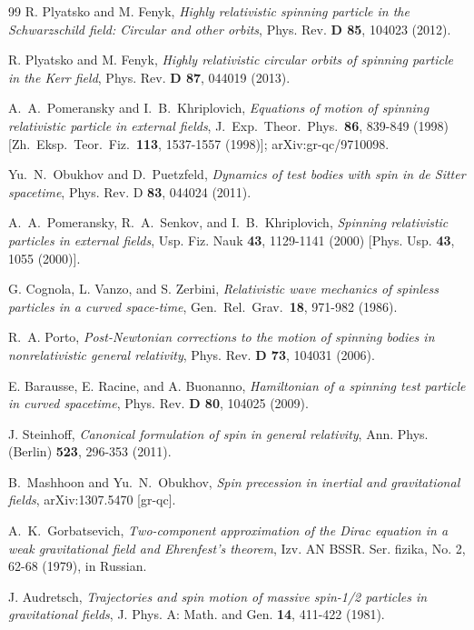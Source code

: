 \documentclass[preprint,showpacs,preprintnumbers,eqsecnum,amsmath,amssymb]{revtex4-1}
\begin{document}
\begin{thebibliography}{99}
R. Plyatsko and M. Fenyk, {\it Highly relativistic spinning particle in the
Schwarzschild field: Circular and other orbits},
Phys. Rev. {\bf D 85}, 104023 (2012).

R. Plyatsko and M. Fenyk,
{\it Highly relativistic circular orbits of spinning particle in the Kerr field},
Phys. Rev. {\bf D 87}, 044019 (2013).

A.~A.~Pomeransky and I.~B.~Khriplovich,
{\it Equations of motion of spinning relativistic particle in external fields},
  J.\ Exp.\ Theor.\ Phys.\ {\bf 86}, 839-849 (1998)
  [Zh.\ Eksp.\ Teor.\ Fiz.\ {\bf 113}, 1537-1557 (1998)];
  arXiv:gr-qc/9710098.

Yu.~N.~Obukhov and D.~Puetzfeld,
{\it Dynamics of test bodies with spin in de Sitter spacetime},
Phys. Rev. D {\bf 83}, 044024 (2011). %

A.~A.~Pomeransky, R.~A.~Senkov, and I.~B.~Khrip\-lo\-vich,
{\it Spinning relativistic particles in external fields},
Usp. Fiz. Nauk {\bf 43}, 1129-1141 %
(2000) [Phys. Usp. {\bf 43}, 1055 (2000)].

G. Cognola, L. Vanzo, and S. Zerbini,
{\it Relativistic wave mechanics of spinless particles in a curved space-time},
Gen.\ Rel.\ Grav.\ {\bf 18}, 971-982 (1986). %

R.~A. Porto, {\it Post-Newtonian corrections to the motion of spinning
bodies in nonrelativistic general relativity},
Phys. Rev. {\bf D 73}, 104031 (2006). %

E. Barausse, E. Racine, and A. Buonanno,
{\it Hamiltonian of a spinning test particle in curved spacetime},
Phys. Rev. {\bf D 80}, 104025 (2009). %

J. Steinhoff, {\it Canonical formulation of spin in general relativity},
Ann. Phys. (Berlin) {\bf 523}, 296-353 (2011). %

B.~Mashhoon and Yu.~N.~Obukhov, {\it Spin precession in inertial and gravitational fields},
arXiv:1307.5470 [gr-qc].

A.~K.~Gorbatsevich, {\it Two-component approximation of the Dirac
equation in a weak gravitational field and Ehrenfest's theorem},
Izv. AN BSSR. Ser. fizika, No. 2, 62-68 (1979), in Russian. %

J. Audretsch,
{\it Trajectories and spin motion of massive spin-1/2 particles in gravitational fields},
J. Phys. A: Math. and Gen. {\bf 14}, 411-422 (1981). %


\end{thebibliography}
\end{document}
